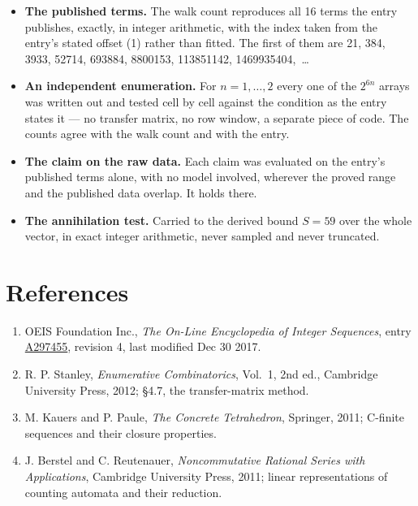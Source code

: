 \documentclass[11pt]{article}
\theoremstyle{definition}
\begin{document}
\begin{itemize}

\item {\bfseries The published terms.} The walk count reproduces all 16 terms the entry publishes, exactly, in integer arithmetic, with the index taken from the entry's stated offset (1) rather than fitted. The first of them are 21, 384, 3933, 52714, 693884, 8800153, 113851142, 1469935404,~\dots

\item {\bfseries An independent enumeration.} For $n = 1,\dots,2$ every one of the $2^{6n}$ arrays was written out and tested cell by cell against the condition as the entry states it --- no transfer matrix, no row window, a separate piece of code. The counts agree with the walk count and with the entry.

\item {\bfseries The claim on the raw data.} Each claim was evaluated on the entry's published terms alone, with no model involved, wherever the proved range and the published data overlap. It holds there.

\item {\bfseries The annihilation test.} Carried to the derived bound $S = 59$ over the whole vector, in exact integer arithmetic, never sampled and never truncated.

\end{itemize}

\section{References}

\begin{enumerate}

\item OEIS Foundation Inc., \emph{The On-Line Encyclopedia of Integer Sequences}, entry \href{https://oeis.org/A297455}{A297455}, revision 4, last modified Dec 30 2017.

\item R. P. Stanley, \emph{Enumerative Combinatorics}, Vol.~1, 2nd ed., Cambridge University Press, 2012; \S4.7, the transfer-matrix method.

\item M. Kauers and P. Paule, \emph{The Concrete Tetrahedron}, Springer, 2011; C-finite sequences and their closure properties.

\item J. Berstel and C. Reutenauer, \emph{Noncommutative Rational Series with Applications}, Cambridge University Press, 2011; linear representations of counting automata and their reduction.

\end{enumerate}
\end{document}
